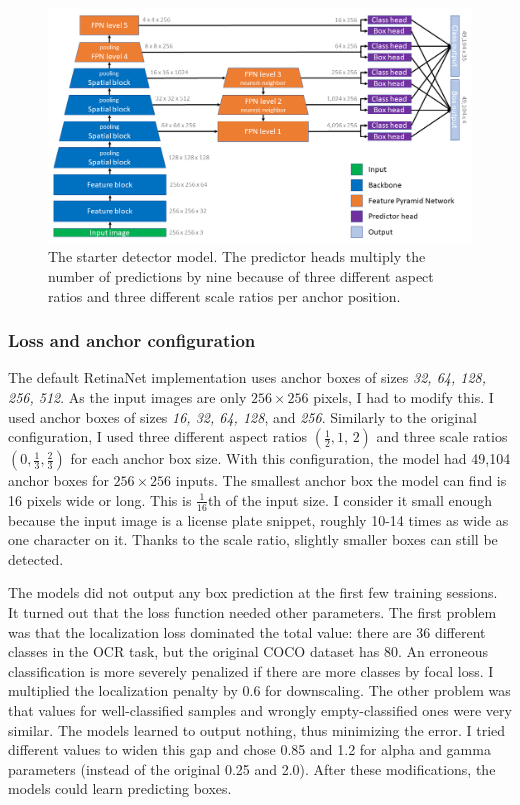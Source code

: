 \begin{figure}[htb]
 \centerline{\includegraphics[width=1.0\columnwidth]{.//Figure/OCR/starter_detector.png}}
 \caption{The starter detector model. The predictor heads multiply the number of predictions by nine because of three different aspect ratios and three different scale ratios per anchor position.}
 \label{fig:starter_detector}
\end{figure}

\subsubsection{Loss and anchor configuration}

The default RetinaNet implementation uses anchor boxes of sizes \textit{32, 64, 128, 256, 512}. As the input images are only $256\times256$ pixels, I had to modify this. I used anchor boxes of sizes \textit{16, 32, 64, 128}, and \textit{256}. Similarly to the original configuration, I used three different aspect ratios \((\frac{1}{2}, \textit{1, 2})\) and three scale ratios \((\textit{0}, \frac{1}{3}, \frac{2}{3})\) for each anchor box size. With this configuration, the model had 49,104 anchor boxes for $256\times256$ inputs. The smallest anchor box the model can find is 16 pixels wide or long. This is \(\frac{1}{16}\)th of the input size. I consider it small enough because the input image is a license plate snippet, roughly 10-14 times as wide as one character on it. Thanks to the scale ratio, slightly smaller boxes can still be detected.

The models did not output any box prediction at the first few training sessions. It turned out that the loss function needed other parameters. The first problem was that the localization loss dominated the total value: there are 36 different classes in the OCR task, but the original COCO dataset has 80. An erroneous classification is more severely penalized if there are more classes by focal loss. I multiplied the localization penalty by 0.6 for downscaling. The other problem was that values for well-classified samples and wrongly empty-classified ones were very similar. The models learned to output nothing, thus minimizing the error. I tried different values to widen this gap and chose 0.85 and 1.2 for alpha and gamma parameters (instead of the original 0.25 and 2.0). After these modifications, the models could learn predicting boxes.


